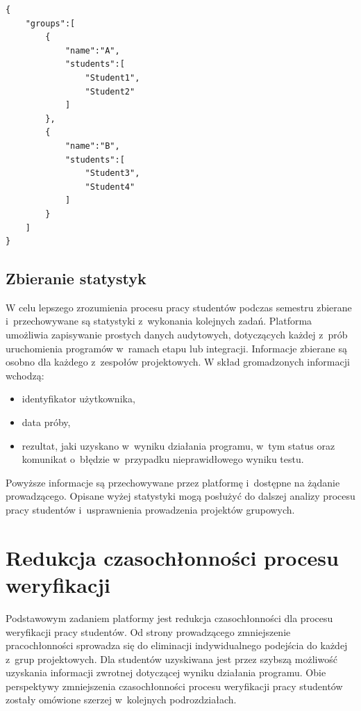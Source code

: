 {\selectfont
\scriptsize
\begin{lstlisting}
{
    "groups":[
        {
            "name":"A",
            "students":[
                "Student1",
                "Student2"
            ]
        },
        {
            "name":"B",
            "students":[
                "Student3",
                "Student4"
            ]
        }
    ]
}
\end{lstlisting}
}
\vfill

\subsection{Zbieranie statystyk}

W celu lepszego zrozumienia procesu pracy studentów podczas semestru zbierane i~przechowywane są statystyki z~wykonania kolejnych zadań.
Platforma umożliwia zapisywanie prostych danych audytowych, dotyczących każdej z~prób uruchomienia programów w~ramach etapu lub integracji.
Informacje zbierane są osobno dla każdego z~zespołów projektowych.
W skład gromadzonych informacji wchodzą:
\begin{itemize}
    \item identyfikator użytkownika,
    \item data próby,
    \item rezultat, jaki uzyskano w~wyniku działania programu, w~tym status oraz komunikat o~błędzie w~przypadku nieprawidłowego wyniku testu.
\end{itemize}
Powyższe informacje są przechowywane przez platformę i~dostępne na żądanie prowadzącego.
Opisane wyżej statystyki mogą posłużyć do dalszej analizy procesu pracy studentów i~usprawnienia prowadzenia projektów grupowych.


\section{Redukcja czasochłonności procesu weryfikacji}

Podstawowym zadaniem platformy jest redukcja czasochłonności dla procesu weryfikacji pracy studentów.
Od strony prowadzącego zmniejszenie pracochłonności sprowadza się do eliminacji indywidualnego podejścia do każdej z~grup projektowych.
Dla studentów uzyskiwana jest przez szybszą możliwość uzyskania informacji zwrotnej dotyczącej wyniku działania programu.
Obie perspektywy zmniejszenia czasochłonności procesu weryfikacji pracy studentów zostały omówione szerzej w~kolejnych podrozdziałach.

